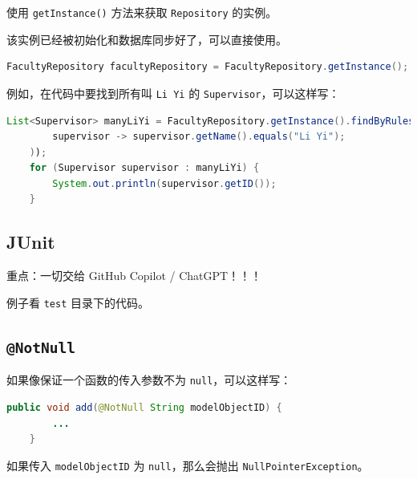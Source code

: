 \documentclass[hyperref,UTF8,12pt,a4paper]{ctexart}
\begin{document}
使用 \texttt{getInstance()} 方法来获取 \texttt{Repository} 的实例。

该实例已经被初始化和数据库同步好了，可以直接使用。

\begin{lstlisting}[language=Java]
	FacultyRepository facultyRepository = FacultyRepository.getInstance();
\end{lstlisting}

例如，在代码中要找到所有叫 \texttt{Li Yi} 的 \texttt{Supervisor}，可以这样写：

\begin{lstlisting}[language=Java]
	List<Supervisor> manyLiYi = FacultyRepository.getInstance().findByRules(
		supervisor -> supervisor.getName().equals("Li Yi");
	));
	for (Supervisor supervisor : manyLiYi) {
		System.out.println(supervisor.getID());
	}
\end{lstlisting}

\subsection{JUnit}

重点：一切交给 GitHub Copilot / ChatGPT！！！

例子看 \texttt{test} 目录下的代码。

\subsection{\texttt{@NotNull}}

如果像保证一个函数的传入参数不为 \texttt{null}，可以这样写：

\begin{lstlisting}[language=Java]
	public void add(@NotNull String modelObjectID) {
		...
	}
\end{lstlisting}

如果传入 \texttt{modelObjectID} 为 \texttt{null}，那么会抛出 \texttt{NullPointerException}。
\end{document}

